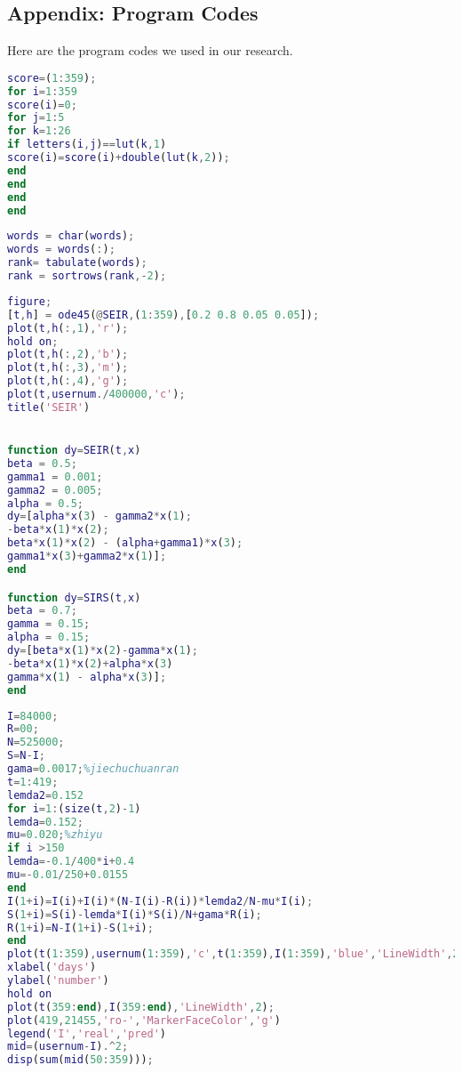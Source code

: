 \documentclass[12pt]{article}  %
\begin{document}
\begin{subappendices}  %

\section{Appendix: Program Codes}
Here are the program codes we used in our research.


\begin{lstlisting}[language=MATLAB, name={score_calc.m}]
score=(1:359);
for i=1:359
score(i)=0;
for j=1:5
for k=1:26
if letters(i,j)==lut(k,1)
score(i)=score(i)+double(lut(k,2));
end
end
end
end

\end{lstlisting}
\begin{lstlisting}[language=MATLAB, name={sort_letter_freq.m}]
words = char(words);
words = words(:);
rank= tabulate(words);
rank = sortrows(rank,-2);
\end{lstlisting}
\begin{lstlisting}[language=MATLAB, name={SEIR_test.m}]
figure;
[t,h] = ode45(@SEIR,(1:359),[0.2 0.8 0.05 0.05]); 
plot(t,h(:,1),'r');
hold on;
plot(t,h(:,2),'b');
plot(t,h(:,3),'m');
plot(t,h(:,4),'g');
plot(t,usernum./400000,'c');
title('SEIR')


function dy=SEIR(t,x)
beta = 0.5;         
gamma1 = 0.001;     
gamma2 = 0.005;      
alpha = 0.5;        
dy=[alpha*x(3) - gamma2*x(1);
-beta*x(1)*x(2);
beta*x(1)*x(2) - (alpha+gamma1)*x(3);
gamma1*x(3)+gamma2*x(1)];
end

function dy=SIRS(t,x)
beta = 0.7;      
gamma = 0.15;    
alpha = 0.15;    
dy=[beta*x(1)*x(2)-gamma*x(1);
-beta*x(1)*x(2)+alpha*x(3)
gamma*x(1) - alpha*x(3)];
end
\end{lstlisting}
\begin{lstlisting}[language=MATLAB, name={SIRS.m}]
I=84000;
R=00;
N=525000;
S=N-I;
gama=0.0017;%jiechuchuanran
t=1:419;
lemda2=0.152
for i=1:(size(t,2)-1)
lemda=0.152;
mu=0.020;%zhiyu
if i >150
lemda=-0.1/400*i+0.4
mu=-0.01/250+0.0155
end            
I(1+i)=I(i)+I(i)*(N-I(i)-R(i))*lemda2/N-mu*I(i);
S(1+i)=S(i)-lemda*I(i)*S(i)/N+gama*R(i);
R(1+i)=N-I(1+i)-S(1+i);
end
plot(t(1:359),usernum(1:359),'c',t(1:359),I(1:359),'blue','LineWidth',2);
xlabel('days')
ylabel('number')
hold on
plot(t(359:end),I(359:end),'LineWidth',2);
plot(419,21455,'ro-','MarkerFaceColor','g')
legend('I','real','pred')
mid=(usernum-I).^2;
disp(sum(mid(50:359)));
\end{lstlisting}

\end{subappendices}  %
\end{document}
